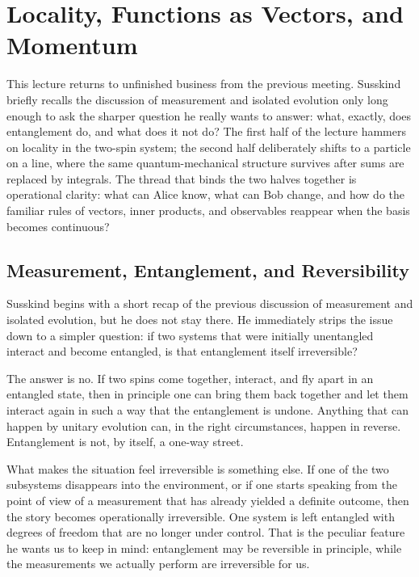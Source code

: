 \chapter{Locality, Functions as Vectors, and Momentum}

This lecture returns to unfinished business from the previous meeting. Susskind briefly recalls the discussion of measurement and isolated evolution only long enough to ask the sharper question he really wants to answer: what, exactly, does entanglement do, and what does it not do? The first half of the lecture hammers on locality in the two-spin system; the second half deliberately shifts to a particle on a line, where the same quantum-mechanical structure survives after sums are replaced by integrals. The thread that binds the two halves together is operational clarity: what can Alice know, what can Bob change, and how do the familiar rules of vectors, inner products, and observables reappear when the basis becomes continuous?

\section{Measurement, Entanglement, and Reversibility}

Susskind begins with a short recap of the previous discussion of measurement and isolated evolution, but he does not stay there. He immediately strips the issue down to a simpler question: if two systems that were initially unentangled interact and become entangled, is that entanglement itself irreversible?

The answer is no. If two spins come together, interact, and fly apart in an entangled state, then in principle one can bring them back together and let them interact again in such a way that the entanglement is undone. Anything that can happen by unitary evolution can, in the right circumstances, happen in reverse. Entanglement is not, by itself, a one-way street.

What makes the situation feel irreversible is something else. If one of the two subsystems disappears into the environment, or if one starts speaking from the point of view of a measurement that has already yielded a definite outcome, then the story becomes operationally irreversible. One system is left entangled with degrees of freedom that are no longer under control. That is the peculiar feature he wants us to keep in mind: entanglement may be reversible in principle, while the measurements we actually perform are irreversible for us.

